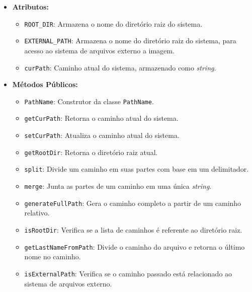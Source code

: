 \documentclass[
    12pt,				%
    oneside,   	        %
    a4paper,			%
    english,			%
    french,				%
    spanish,			%
    brazil,				%
    ]{pacotes/abntex2}
\begin{document}
\begin{itemize}
    \item \textbf{Atributos:}
        \begin{itemize}
            \item \texttt{ROOT\_DIR}: Armazena o nome do diretório raiz do sistema.
            \item \texttt{EXTERNAL\_PATH}: Armazena o nome do diretório raiz do sistema, para acesso ao sistema de arquivos externo a imagem.
            \item \texttt{curPath}: Caminho atual do sistema, armazenado como \textit{string}.
        \end{itemize}
    \item \textbf{Métodos Públicos:}
        \begin{itemize}
            \item \texttt{PathName}: Construtor da classe \texttt{PathName}.
            \item \texttt{getCurPath}: Retorna o caminho atual do sistema.
            \item \texttt{setCurPath}: Atualiza o caminho atual do sistema.
            \item \texttt{getRootDir}: Retorna o diretório raiz atual.
            \item \texttt{split}: Divide um caminho em suas partes com base em um delimitador.
            \item \texttt{merge}: Junta as partes de um caminho em uma única \textit{string}.
            \item \texttt{generateFullPath}: Gera o caminho completo a partir de um caminho relativo.
            \item \texttt{isRootDir}: Verifica se a lista de caminhos é referente ao diretório raiz.
            \item \texttt{getLastNameFromPath}: Divide o caminho do arquivo e retorna o último nome no caminho.
            \item \texttt{isExternalPath}: Verifica se o caminho passado está relacionado ao sistema de arquivos externo.
        \end{itemize}
\end{itemize}
\end{document}
